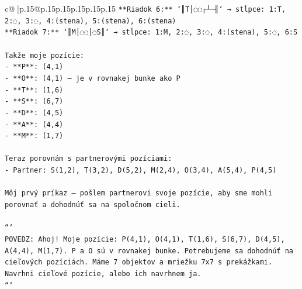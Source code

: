 \documentclass{article}
\begin{document}
{\begin{supertabular}{c@{$\;$}|p{.15\linewidth}@{}p{.15\linewidth}p{.15\linewidth}p{.15\linewidth}p{.15\linewidth}p{.15\linewidth}}
{{{\texttt{**Riadok 6:** `║T│◌◌┌┴─╢` → stĺpce: 1:T, 2:◌, 3:◌, 4:(stena), 5:(stena), 6:(stena)} \\
\texttt{**Riadok 7:** `║M│◌◌│◌S║` → stĺpce: 1:M, 2:◌, 3:◌, 4:(stena), 5:◌, 6:S} \\
\\ 
\texttt{Takže moje pozície:} \\
\texttt{{-} **P**: (4,1)} \\
\texttt{{-} **O**: (4,1) — je v rovnakej bunke ako P} \\
\texttt{{-} **T**: (1,6)} \\
\texttt{{-} **S**: (6,7)} \\
\texttt{{-} **D**: (4,5)} \\
\texttt{{-} **A**: (4,4)} \\
\texttt{{-} **M**: (1,7)} \\
\\ 
\texttt{Teraz porovnám s partnerovými pozíciami:} \\
\texttt{{-} Partner: S(1,2), T(3,2), D(5,2), M(2,4), O(3,4), A(5,4), P(4,5)} \\
\\ 
\texttt{Môj prvý príkaz — pošlem partnerovi svoje pozície, aby sme mohli porovnať a dohodnúť sa na spoločnom cieli.} \\
\\ 
\texttt{```} \\
\texttt{POVEDZ: Ahoj! Moje pozície: P(4,1), O(4,1), T(1,6), S(6,7), D(4,5), A(4,4), M(1,7). P a O sú v rovnakej bunke. Potrebujeme sa dohodnúť na cieľových pozíciách. Máme 7 objektov a mriežku 7x7 s prekážkami. Navrhni cieľové pozície, alebo ich navrhnem ja.} \\
\texttt{```} \\
            }
        }
    }
     \\ \\


\end{supertabular}}
\end{document}
